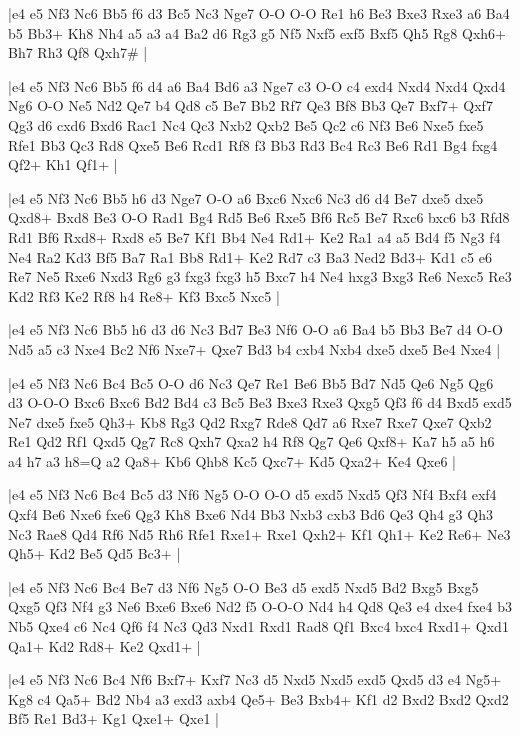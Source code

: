 \whitename{}
\blackname{}
\makegametitle
|e4 e5 Nf3 Nc6 Bb5 f6 d3 Bc5 Nc3 Nge7 O-O O-O Re1 h6 Be3 Bxe3 Rxe3 a6 Ba4 b5 Bb3+ Kh8 Nh4 a5 a3 a4 Ba2 d6 Rg3 g5 Nf5 Nxf5 exf5 Bxf5 Qh5 Rg8 Qxh6+ Bh7 Rh3 Qf8 Qxh7\#  |

\whitename{}
\blackname{}
\makegametitle
|e4 e5 Nf3 Nc6 Bb5 f6 d4 a6 Ba4 Bd6 a3 Nge7 c3 O-O c4 exd4 Nxd4 Nxd4 Qxd4 Ng6 O-O Ne5 Nd2 Qe7 b4 Qd8 c5 Be7 Bb2 Rf7 Qe3 Bf8 Bb3 Qe7 Bxf7+ Qxf7 Qg3 d6 cxd6 Bxd6 Rac1 Nc4 Qc3 Nxb2 Qxb2 Be5 Qc2 c6 Nf3 Be6 Nxe5 fxe5 Rfe1 Bb3 Qc3 Rd8 Qxe5 Be6 Rcd1 Rf8 f3 Bb3 Rd3 Bc4 Rc3 Be6 Rd1 Bg4 fxg4 Qf2+ Kh1 Qf1+  |

\whitename{}
\blackname{}
\makegametitle
|e4 e5 Nf3 Nc6 Bb5 h6 d3 Nge7 O-O a6 Bxc6 Nxc6 Nc3 d6 d4 Be7 dxe5 dxe5 Qxd8+ Bxd8 Be3 O-O Rad1 Bg4 Rd5 Be6 Rxe5 Bf6 Rc5 Be7 Rxc6 bxc6 b3 Rfd8 Rd1 Bf6 Rxd8+ Rxd8 e5 Be7 Kf1 Bb4 Ne4 Rd1+ Ke2 Ra1 a4 a5 Bd4 f5 Ng3 f4 Ne4 Ra2 Kd3 Bf5 Ba7 Ra1 Bb8 Rd1+ Ke2 Rd7 c3 Ba3 Ned2 Bd3+ Kd1 c5 e6 Re7 Ne5 Rxe6 Nxd3 Rg6 g3 fxg3 fxg3 h5 Bxc7 h4 Ne4 hxg3 Bxg3 Re6 Nexc5 Re3 Kd2 Rf3 Ke2 Rf8 h4 Re8+ Kf3 Bxc5 Nxc5  |

\whitename{}
\blackname{}
\makegametitle
|e4 e5 Nf3 Nc6 Bb5 h6 d3 d6 Nc3 Bd7 Be3 Nf6 O-O a6 Ba4 b5 Bb3 Be7 d4 O-O Nd5 a5 c3 Nxe4 Bc2 Nf6 Nxe7+ Qxe7 Bd3 b4 cxb4 Nxb4 dxe5 dxe5 Be4 Nxe4  |

\whitename{}
\blackname{}
\makegametitle
|e4 e5 Nf3 Nc6 Bc4 Bc5 O-O d6 Nc3 Qe7 Re1 Be6 Bb5 Bd7 Nd5 Qe6 Ng5 Qg6 d3 O-O-O Bxc6 Bxc6 Bd2 Bd4 c3 Bc5 Be3 Bxe3 Rxe3 Qxg5 Qf3 f6 d4 Bxd5 exd5 Ne7 dxe5 fxe5 Qh3+ Kb8 Rg3 Qd2 Rxg7 Rde8 Qd7 a6 Rxe7 Rxe7 Qxe7 Qxb2 Re1 Qd2 Rf1 Qxd5 Qg7 Rc8 Qxh7 Qxa2 h4 Rf8 Qg7 Qe6 Qxf8+ Ka7 h5 a5 h6 a4 h7 a3 h8=Q a2 Qa8+ Kb6 Qhb8 Kc5 Qxc7+ Kd5 Qxa2+ Ke4 Qxe6  |

\whitename{}
\blackname{}
\makegametitle
|e4 e5 Nf3 Nc6 Bc4 Bc5 d3 Nf6 Ng5 O-O O-O d5 exd5 Nxd5 Qf3 Nf4 Bxf4 exf4 Qxf4 Be6 Nxe6 fxe6 Qg3 Kh8 Bxe6 Nd4 Bb3 Nxb3 cxb3 Bd6 Qe3 Qh4 g3 Qh3 Nc3 Rae8 Qd4 Rf6 Nd5 Rh6 Rfe1 Rxe1+ Rxe1 Qxh2+ Kf1 Qh1+ Ke2 Re6+ Ne3 Qh5+ Kd2 Be5 Qd5 Bc3+  |

\whitename{}
\blackname{}
\makegametitle
|e4 e5 Nf3 Nc6 Bc4 Be7 d3 Nf6 Ng5 O-O Be3 d5 exd5 Nxd5 Bd2 Bxg5 Bxg5 Qxg5 Qf3 Nf4 g3 Ne6 Bxe6 Bxe6 Nd2 f5 O-O-O Nd4 h4 Qd8 Qe3 e4 dxe4 fxe4 b3 Nb5 Qxe4 c6 Nc4 Qf6 f4 Nc3 Qd3 Nxd1 Rxd1 Rad8 Qf1 Bxc4 bxc4 Rxd1+ Qxd1 Qa1+ Kd2 Rd8+ Ke2 Qxd1+  |

\whitename{}
\blackname{}
\makegametitle
|e4 e5 Nf3 Nc6 Bc4 Nf6 Bxf7+ Kxf7 Nc3 d5 Nxd5 Nxd5 exd5 Qxd5 d3 e4 Ng5+ Kg8 c4 Qa5+ Bd2 Nb4 a3 exd3 axb4 Qe5+ Be3 Bxb4+ Kf1 d2 Bxd2 Bxd2 Qxd2 Bf5 Re1 Bd3+ Kg1 Qxe1+ Qxe1  |

